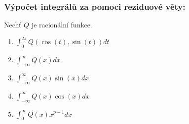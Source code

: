 \subsubsection*{Výpočet integrálů za pomoci reziduové věty:}

Nechť $Q$ je racionální funkce.

\begin{enumerate}
\item $\int_0^{2\pi} Q(\cos(t), \sin(t))dt$
\item $\int_{-\infty}^\infty Q(x) dx$
\item $\int_{-\infty}^{\infty} Q(x) \sin(x) dx$
\item $\int_{-\infty}^{\infty} Q(x) \cos(x) dx$
\item $\int_0^{\infty} Q(x) x^{p-1} dx$
\end{enumerate}